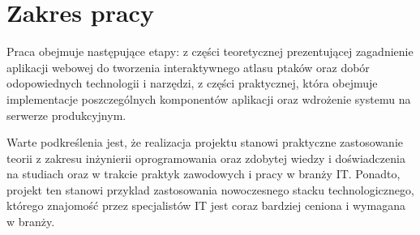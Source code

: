 \section*{Zakres pracy}

Praca obejmuje następujące etapy: z części teoretycznej prezentującej zagadnienie aplikacji webowej do tworzenia interaktywnego atlasu ptaków oraz dobór odopowiednych technologii i narzędzi,
z części praktycznej, która obejmuje implementacje poszczególnych komponentów aplikacji oraz wdrożenie systemu na serwerze produkcyjnym.

Warte podkreślenia jest, że realizacja projektu stanowi praktyczne zastosowanie teorii z zakresu inżynierii oprogramowania oraz zdobytej wiedzy i doświadczenia na studiach
oraz w trakcie praktyk zawodowych i pracy w branży IT. Ponadto, projekt ten stanowi przyklad zastosowania nowoczesnego stacku technologicznego, którego znajomość przez specjalistów IT jest coraz bardziej ceniona i wymagana w branży.



